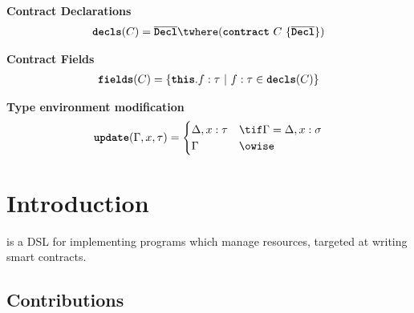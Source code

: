 \documentclass[10pt]{article}
\begin{document}
 \textbf{Contract Declarations}
\begin{align*}
    \decls(C) = \overline{\Decl} \twhere (\contract~C~\{ \overline{\Decl} \})
\end{align*}

 \textbf{Contract Fields}
\begin{align*}
    \textbf{\texttt{fields}}(C) = \left\{ {\textbf{\texttt{this}}.f : \tau} ~|~ {f : \tau \in \textbf{\texttt{decls}}(C)} \right\}
\end{align*}

 \textbf{Type environment modification}
\[
    \update(\Gamma, x, \tau) =
    \begin{cases}
        \Delta, x : \tau & \tif \Gamma = \Delta, x : \sigma \\
        \Gamma & \owise
    \end{cases}
\]



\section{Introduction}

\langName is a DSL for implementing programs which manage resources, targeted at writing smart contracts.

\subsection{Contributions}
\end{document}
